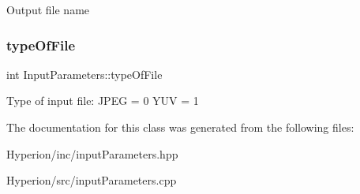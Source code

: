 Output file name \mbox{\label{classInputParameters_a826c20599ad2c8d4f82f1b84055668dd}} 
\subsubsection{\texorpdfstring{type\+Of\+File}{typeOfFile}}
{\footnotesize\ttfamily int Input\+Parameters\+::type\+Of\+File}

Type of input file\+: J\+P\+EG = 0 Y\+UV = 1 

The documentation for this class was generated from the following files\+:\begin{DoxyCompactItemize}
\item 
Hyperion/inc/input\+Parameters.\+hpp\item 
Hyperion/src/input\+Parameters.\+cpp\end{DoxyCompactItemize}
